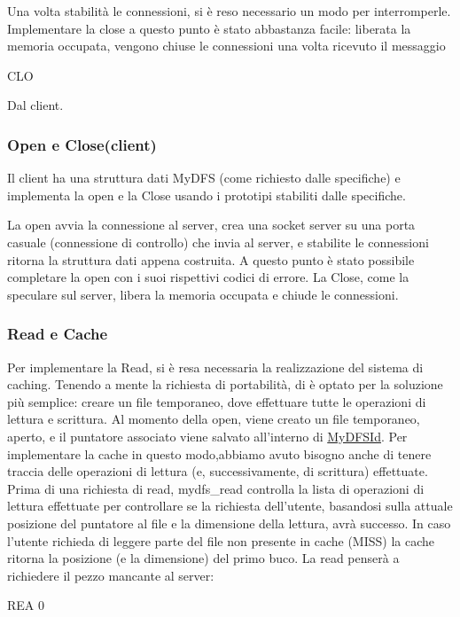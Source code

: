 Una volta stabilità le connessioni, si è reso necessario un modo per interromperle. Implementare la close a questo punto è stato abbastanza facile\+: liberata la memoria occupata, vengono chiuse le connessioni una volta ricevuto il messaggio \begin{DoxyVerb}CLO
\end{DoxyVerb}


Dal client.

\subsubsection*{Open e Close(client)}

Il client ha una struttura dati My\+D\+F\+S (come richiesto dalle specifiche) e implementa la open e la Close usando i prototipi stabiliti dalle specifiche.

La open avvia la connessione al server, crea una socket server su una porta casuale (connessione di controllo) che invia al server, e stabilite le connessioni ritorna la struttura dati appena costruita. A questo punto è stato possibile completare la open con i suoi rispettivi codici di errore. La Close, come la speculare sul server, libera la memoria occupata e chiude le connessioni.

\subsubsection*{Read e Cache}

Per implementare la Read, si è resa necessaria la realizzazione del sistema di caching. Tenendo a mente la richiesta di portabilità, di è optato per la soluzione più semplice\+: creare un file temporaneo, dove effettuare tutte le operazioni di lettura e scrittura. Al momento della open, viene creato un file temporaneo, aperto, e il puntatore associato viene salvato all'interno di \hyperlink{structMyDFSId}{My\+D\+F\+S\+Id}. Per implementare la cache in questo modo,abbiamo avuto bisogno anche di tenere traccia delle operazioni di lettura (e, successivamente, di scrittura) effettuate. Prima di una richiesta di read, mydfs\+\_\+read controlla la lista di operazioni di lettura effettuate per controllare se la richiesta dell'utente, basandosi sulla attuale posizione del puntatore al file e la dimensione della lettura, avrà successo. In caso l'utente richieda di leggere parte del file non presente in cache (M\+I\+S\+S) la cache ritorna la posizione (e la dimensione) del primo buco. La read penserà a richiedere il pezzo mancante al server\+: \begin{DoxyVerb}REA 0
\end{DoxyVerb}


